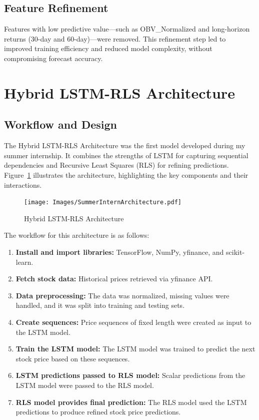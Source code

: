 \subsection{Feature Refinement}
Features with low predictive value—such as OBV\_Normalized and long-horizon returns (30-day and 60-day)—were removed. This refinement step led to improved training efficiency and reduced model complexity, without compromising forecast accuracy.

\newpage
\section{Hybrid LSTM-RLS Architecture}

\subsection{Workflow and Design}
The Hybrid LSTM-RLS Architecture was the first model developed during my summer internship. It combines the strengths of LSTM for capturing sequential dependencies and Recursive Least Squares (RLS) for refining predictions. Figure~\ref{fig:summerarch} illustrates the architecture, highlighting the key components and their interactions.

\begin{figure}[h!]
    \centering
    \texttt{[image: Images/SummerInternArchitecture.pdf]} %
    \caption{Hybrid LSTM-RLS Architecture}
    \label{fig:summerarch}
\end{figure}

The workflow for this architecture is as follows:
\begin{enumerate}
    \item \textbf{Install and import libraries:} TensorFlow, NumPy, yfinance, and scikit-learn.
    \item \textbf{Fetch stock data:} Historical prices retrieved via yfinance API.
    \item \textbf{Data preprocessing:} The data was normalized, missing values were handled, and it was split into training and testing sets.
    \item \textbf{Create sequences:} Price sequences of fixed length were created as input to the LSTM model.
    \item \textbf{Train the LSTM model:} The LSTM model was trained to predict the next stock price based on these sequences.
    \item \textbf{LSTM predictions passed to RLS model:} Scalar predictions from the LSTM model were passed to the RLS model.
    \item \textbf{RLS model provides final prediction:} The RLS model used the LSTM predictions to produce refined stock price predictions.
\end{enumerate}

